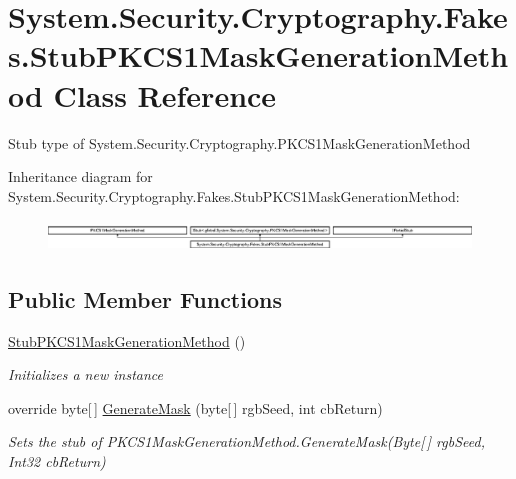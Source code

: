 \hypertarget{class_system_1_1_security_1_1_cryptography_1_1_fakes_1_1_stub_p_k_c_s1_mask_generation_method}{\section{System.\-Security.\-Cryptography.\-Fakes.\-Stub\-P\-K\-C\-S1\-Mask\-Generation\-Method Class Reference}
\label{class_system_1_1_security_1_1_cryptography_1_1_fakes_1_1_stub_p_k_c_s1_mask_generation_method}
}


Stub type of System.\-Security.\-Cryptography.\-P\-K\-C\-S1\-Mask\-Generation\-Method 


Inheritance diagram for System.\-Security.\-Cryptography.\-Fakes.\-Stub\-P\-K\-C\-S1\-Mask\-Generation\-Method\-:\begin{figure}[H]
\begin{center}
\leavevmode
\includegraphics[height=0.809834cm]{class_system_1_1_security_1_1_cryptography_1_1_fakes_1_1_stub_p_k_c_s1_mask_generation_method}
\end{center}
\end{figure}
\subsection*{Public Member Functions}
\begin{DoxyCompactItemize}
\item 
\hyperlink{class_system_1_1_security_1_1_cryptography_1_1_fakes_1_1_stub_p_k_c_s1_mask_generation_method_a8acaabf5ed87b088b43782f789fcba4a}{Stub\-P\-K\-C\-S1\-Mask\-Generation\-Method} ()
\begin{DoxyCompactList}\small\item\em Initializes a new instance\end{DoxyCompactList}\item 
override byte\mbox{[}$\,$\mbox{]} \hyperlink{class_system_1_1_security_1_1_cryptography_1_1_fakes_1_1_stub_p_k_c_s1_mask_generation_method_a21117e3133f62546581b87c605fa5af4}{Generate\-Mask} (byte\mbox{[}$\,$\mbox{]} rgb\-Seed, int cb\-Return)
\begin{DoxyCompactList}\small\item\em Sets the stub of P\-K\-C\-S1\-Mask\-Generation\-Method.\-Generate\-Mask(\-Byte\mbox{[}$\,$\mbox{]} rgb\-Seed, Int32 cb\-Return)\end{DoxyCompactList}\end{DoxyCompactItemize}
